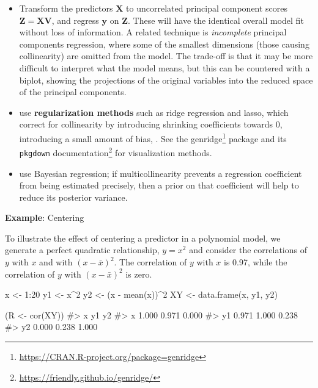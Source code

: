 \documentclass[
  letterpaper,
  10pt,
  krantz2]{krantz}
\makeatletter
\newenvironment{Shaded}{\begin{snugshade}}{\end{snugshade}}
\newcommand{\CommentTok}[1]{\textcolor[rgb]{0.37,0.37,0.37}{#1}}
\newcommand{\DecValTok}[1]{\textcolor[rgb]{0.68,0.00,0.00}{#1}}
\newcommand{\FunctionTok}[1]{\textcolor[rgb]{0.28,0.35,0.67}{#1}}
\newcommand{\NormalTok}[1]{\textcolor[rgb]{0.00,0.23,0.31}{#1}}
\newcommand{\OtherTok}[1]{\textcolor[rgb]{0.00,0.23,0.31}{#1}}
\newcommand{\SpecialCharTok}[1]{\textcolor[rgb]{0.37,0.37,0.37}{#1}}
\providecommand{\href}[2]{#2\footnote{\url{#1}}}
\newenvironment{kframe}{%
  \medskip{}
  \setlength{\fboxsep}{.8em}
  \def\at@end@of@kframe{}%
  \ifinner\ifhmode%
  \def\at@end@of@kframe{\end{minipage}}%
  \begin{minipage}{\columnwidth}%
  \fi\fi%
  \def\FrameCommand##1{\hskip\@totalleftmargin \hskip-\fboxsep
  \colorbox{shadecolor}{##1}\hskip-\fboxsep
      \hskip-\linewidth \hskip-\@totalleftmargin \hskip\columnwidth}%
  \MakeFramed {\advance\hsize-\width
    \@totalleftmargin\z@ \linewidth\hsize
    \@setminipage}}%
{\par\unskip\endMakeFramed%
  \at@end@of@kframe}
\renewenvironment{Shaded}{\begin{kframe}}{\end{kframe}}
\makeatother
\begin{document}
\begin{itemize}
  \begin{itemize}
  \item
    Transform the predictors \(\mathbf{X}\) to uncorrelated principal
    component scores \(\mathbf{Z} = \mathbf{X} \mathbf{V}\), and regress
    \(\mathbf{y}\) on \(\mathbf{Z}\). These will have the identical
    overall model fit without loss of information. A related technique
    is \emph{incomplete} principal components regression, where some of
    the smallest dimensions (those causing collinearity) are omitted
    from the model. The trade-off is that it may be more difficult to
    interpret what the model means, but this can be countered with a
    biplot, showing the projections of the original variables into the
    reduced space of the principal components.
  \item
    use \textbf{regularization methods} such as ridge regression and
    lasso, which correct for collinearity by introducing shrinking
    coefficients towards 0, introducing a small amount of bias, . See
    the \href{https://CRAN.R-project.org/package=genridge}{genridge}
    package and its
    \href{https://friendly.github.io/genridge/}{\texttt{pkgdown}
    documentation} for visualization methods.
  \item
    use Bayesian regression; if multicollinearity prevents a regression
    coefficient from being estimated precisely, then a prior on that
    coefficient will help to reduce its posterior variance.
  \end{itemize}
\end{itemize}

\textbf{Example}: Centering

To illustrate the effect of centering a predictor in a polynomial model,
we generate a perfect quadratic relationship, \(y = x^2\) and consider
the correlations of \(y\) with \(x\) and with \((x - \bar{x})^2\). The
correlation of \(y\) with \(x\) is 0.97, while the correlation of \(y\)
with \((x - \bar{x})^2\) is zero.

\begin{Shaded}
\begin{Highlighting}[]
\NormalTok{x }\OtherTok{\textless{}{-}} \DecValTok{1}\SpecialCharTok{:}\DecValTok{20}
\NormalTok{y1 }\OtherTok{\textless{}{-}}\NormalTok{ x}\SpecialCharTok{\^{}}\DecValTok{2}
\NormalTok{y2 }\OtherTok{\textless{}{-}}\NormalTok{ (x }\SpecialCharTok{{-}} \FunctionTok{mean}\NormalTok{(x))}\SpecialCharTok{\^{}}\DecValTok{2}
\NormalTok{XY }\OtherTok{\textless{}{-}} \FunctionTok{data.frame}\NormalTok{(x, y1, y2)}

\NormalTok{(R }\OtherTok{\textless{}{-}} \FunctionTok{cor}\NormalTok{(XY))}
\CommentTok{\#\textgreater{}        x    y1    y2}
\CommentTok{\#\textgreater{} x  1.000 0.971 0.000}
\CommentTok{\#\textgreater{} y1 0.971 1.000 0.238}
\CommentTok{\#\textgreater{} y2 0.000 0.238 1.000}
\end{Highlighting}
\end{Shaded}
\end{document}
